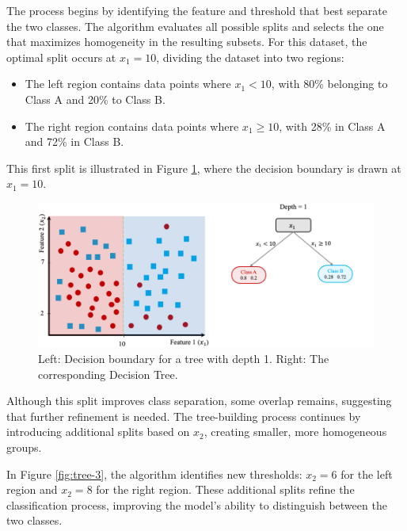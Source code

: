 \documentclass[
]{book}
\providecommand{\tightlist}{%
  \setlength{\itemsep}{0pt}\setlength{\parskip}{0pt}}
\theoremstyle{definition}
\theoremstyle{definition}
\theoremstyle{definition}
\theoremstyle{definition}
\theoremstyle{remark}
\begin{document}
The process begins by identifying the feature and threshold that best separate the two classes. The algorithm evaluates all possible splits and selects the one that maximizes homogeneity in the resulting subsets. For this dataset, the optimal split occurs at \(x_1 = 10\), dividing the dataset into two regions:

\begin{itemize}
\tightlist
\item
  The left region contains data points where \(x_1 < 10\), with 80\% belonging to Class A and 20\% to Class B.
\item
  The right region contains data points where \(x_1 \geq 10\), with 28\% in Class A and 72\% in Class B.
\end{itemize}

This first split is illustrated in Figure \ref{fig:tree-2}, where the decision boundary is drawn at \(x_1 = 10\).

\begin{figure}

{\centering \includegraphics[width=1\linewidth]{images/ex_tree_2} 

}

\caption{Left: Decision boundary for a tree with depth 1. Right: The corresponding Decision Tree.}\label{fig:tree-2}
\end{figure}

Although this split improves class separation, some overlap remains, suggesting that further refinement is needed. The tree-building process continues by introducing additional splits based on \(x_2\), creating smaller, more homogeneous groups.

In Figure \ref{fig:tree-3}, the algorithm identifies new thresholds: \(x_2 = 6\) for the left region and \(x_2 = 8\) for the right region. These additional splits refine the classification process, improving the model's ability to distinguish between the two classes.
\end{document}
